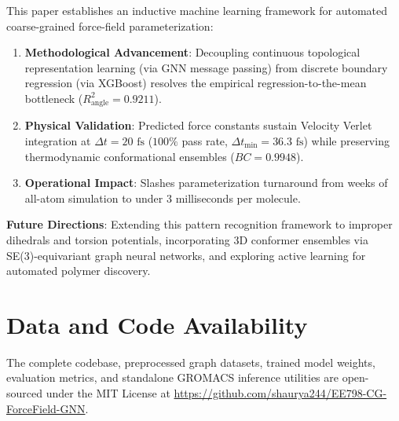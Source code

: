 \documentclass[11pt,a4paper]{article}
\begin{document}
This paper establishes an inductive machine learning framework for automated coarse-grained force-field parameterization:
\begin{enumerate}
    \item \textbf{Methodological Advancement}: Decoupling continuous topological representation learning (via GNN message passing) from discrete boundary regression (via XGBoost) resolves the empirical regression-to-the-mean bottleneck ($R^2_{\text{angle}} = \mathbf{0.9211}$).
    \item \textbf{Physical Validation}: Predicted force constants sustain Velocity Verlet integration at $\Delta t = 20\text{ fs}$ ($100\%$ pass rate, $\Delta t_{\min} = 36.3\text{ fs}$) while preserving thermodynamic conformational ensembles ($BC = 0.9948$).
    \item \textbf{Operational Impact}: Slashes parameterization turnaround from weeks of all-atom simulation to under 3 milliseconds per molecule.
\end{enumerate}

\textbf{Future Directions}: Extending this pattern recognition framework to improper dihedrals and torsion potentials, incorporating 3D conformer ensembles via SE(3)-equivariant graph neural networks, and exploring active learning for automated polymer discovery.

\section*{Data and Code Availability}
The complete codebase, preprocessed graph datasets, trained model weights, evaluation metrics, and standalone GROMACS inference utilities are open-sourced under the MIT License at \url{https://github.com/shaurya244/EE798-CG-ForceField-GNN}.



\end{document}
